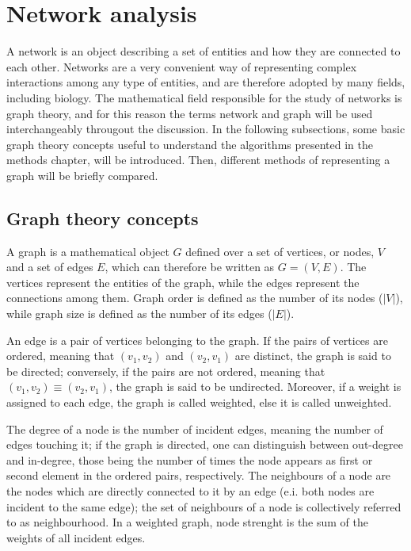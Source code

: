 \section{Network analysis}

A network is an object describing a set of entities and how they are connected to each other. Networks are a very convenient way of representing complex interactions among any type of entities, and are therefore adopted by many fields, including biology. The mathematical field responsible for the study of networks is graph theory, and for this reason the terms network and graph will be used interchangeably througout the discussion. In the following subsections, some basic graph theory concepts useful to understand the algorithms presented in the methods chapter, will be introduced. Then, different methods of representing a graph will be briefly compared.

\subsection{Graph theory concepts}
A graph is a mathematical object $G$ defined over a set of vertices, or nodes, $V$ and a set of edges $E$, which can therefore be written as $G=(V,E)$. The vertices represent the entities of the graph, while the edges represent the connections among them. Graph order is defined as the number of its nodes ($|V|$), while graph size is defined as the number of its edges ($|E|$).

An edge is a pair of vertices belonging to the graph. If the pairs of vertices are ordered, meaning that $(v_1,v_2)$ and $(v_2, v_1)$ are distinct, the graph is said to be directed; conversely, if the pairs are not ordered, meaning that $(v_1,v_2) \equiv (v_2, v_1)$, the graph is said to be undirected. Moreover, if a weight is assigned to each edge, the graph is called weighted, else it is called unweighted.

The degree of a node is the number of incident edges, meaning the number of edges touching it; if the graph is directed, one can distinguish between out-degree and in-degree, those being the number of times the node appears as first or second element in the ordered pairs, respectively. The neighbours of a node are the nodes which are directly connected to it by an edge (e.i. both nodes are incident to the same edge); the set of neighbours of a node is collectively referred to as neighbourhood. In a weighted graph, node strenght is the sum of the weights of all incident edges. 

